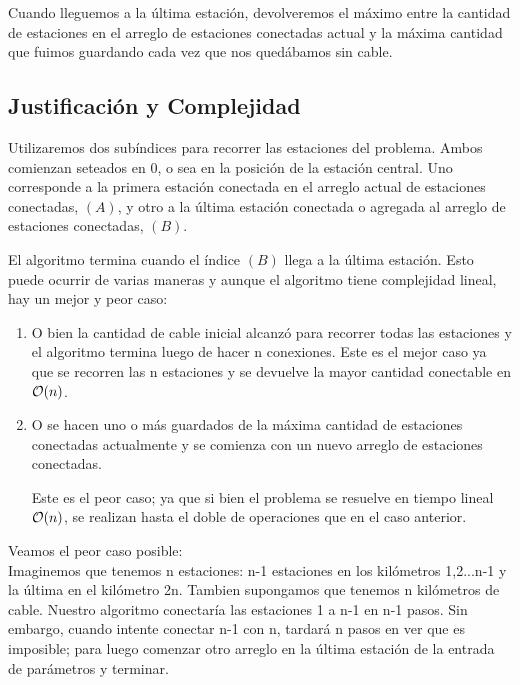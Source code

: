  Cuando lleguemos a la \'ultima estaci\'on, devolveremos el m\'aximo entre la cantidad de estaciones en el arreglo de estaciones conectadas actual y la m\'axima cantidad que fuimos guardando cada vez que nos qued\'abamos sin cable.
 
 
\pagebreak

\subsection{Justificaci\'on y Complejidad}

 Utilizaremos dos sub\'indices para recorrer las estaciones del problema. Ambos comienzan seteados en 0, o sea en la posici\'on de la estaci\'on central. Uno corresponde a la primera estaci\'on conectada en el arreglo actual de estaciones conectadas, $(A)$, y otro a la \'ultima estaci\'on conectada o agregada al arreglo de estaciones conectadas, $(B)$. 
 
El algoritmo termina cuando el \'indice $(B)$ llega a la \'ultima estaci\'on. Esto puede ocurrir de varias maneras y aunque el algoritmo tiene complejidad lineal, hay un mejor y peor caso:

\begin{enumerate}
    \item O bien la cantidad de cable inicial alcanz\'o para recorrer todas las estaciones y el algoritmo termina luego de hacer n conexiones.
    \subitem Este es el mejor caso ya que se recorren las n estaciones y se devuelve la mayor cantidad conectable en $\mathcal{O}(n)$.
    
    \item O se hacen uno o m\'as guardados de la m\'axima cantidad de estaciones conectadas actualmente y se comienza con un nuevo arreglo de estaciones conectadas.
    
    \subitem Este es el peor caso; ya que si bien el problema se resuelve en tiempo lineal $\mathcal{O}(n)$, se realizan hasta el doble de operaciones que en el caso anterior. 
\end{enumerate}
    
Veamos el peor caso posible: \\
    
     Imaginemos que tenemos n estaciones: n-1 estaciones en los kil\'ometros {1,2...n-1} y la \'ultima en el kil\'ometro  2n. Tambien supongamos que tenemos n kil\'ometros de cable. Nuestro algoritmo conectar\'ia las estaciones 1 a n-1 en n-1 pasos. Sin embargo, cuando intente conectar n-1 con n, tardar\'a n pasos en ver que es imposible; para luego comenzar otro arreglo en la \'ultima estaci\'on de la entrada de par\'ametros y terminar.\\


